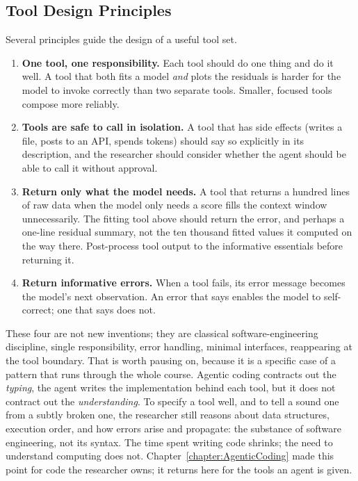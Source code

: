\subsection{Tool Design Principles}

Several principles guide the design of a useful tool set.

\begin{enumerate}
\item \textbf{One tool, one responsibility.}
Each tool should do one thing and do it well.
A tool that both fits a model \emph{and} plots the residuals is harder for the model to invoke correctly than two separate tools.
Smaller, focused tools compose more reliably.

\item \textbf{Tools are safe to call in isolation.}
A tool that has side effects (writes a file, posts to an API, spends tokens) should say so explicitly in its description, and the researcher should consider whether the agent should be able to call it without approval.

\item \textbf{Return only what the model needs.}
A tool that returns a hundred lines of raw data when the model only needs a score fills the context window unnecessarily.
The fitting tool above should return the error, and perhaps a one-line residual summary, not the ten thousand fitted values it computed on the way there.
Post-process tool output to the informative essentials before returning it.

\item \textbf{Return informative errors.}
When a tool fails, its error message becomes the model's next observation.
An error that says  enables the model to self-correct; one that says  does not.
\end{enumerate}

These four are not new inventions; they are classical software-engineering discipline, single responsibility, error handling, minimal interfaces, reappearing at the tool boundary.
That is worth pausing on, because it is a specific case of a pattern that runs through the whole course.
Agentic coding contracts out the \emph{typing}, the agent writes the implementation behind each tool, but it does not contract out the \emph{understanding}.
To specify a tool well, and to tell a sound one from a subtly broken one, the researcher still reasons about data structures, execution order, and how errors arise and propagate: the substance of software engineering, not its syntax.
The time spent writing code shrinks; the need to understand computing does not.
Chapter~\ref{chapter:AgenticCoding} made this point for code the researcher owns; it returns here for the tools an agent is given.

